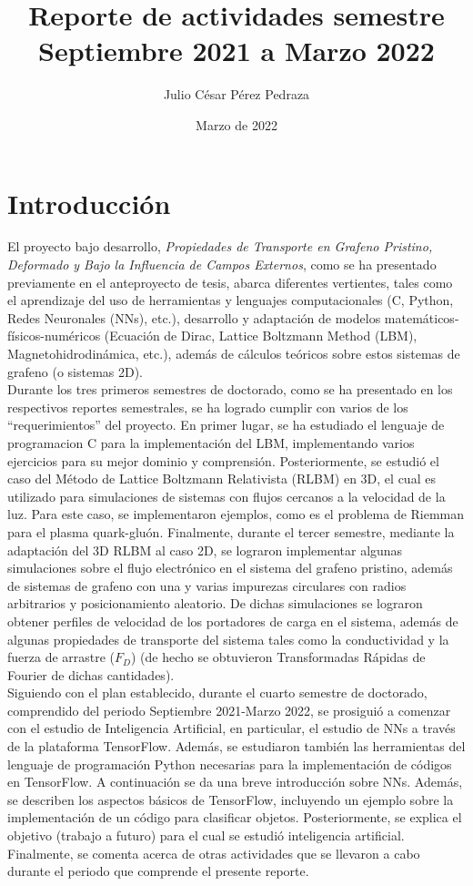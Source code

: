 \documentclass{article}
\title{Reporte de actividades semestre Septiembre 2021 a Marzo 2022}
\author{Julio César Pérez Pedraza}
\date{Marzo de 2022}
\begin{document}
\maketitle

\section{Introducción}

El proyecto bajo desarrollo, \textit{Propiedades de Transporte en Grafeno Pristino, Deformado y Bajo la Influencia de Campos Externos}, como se ha presentado previamente en el anteproyecto de tesis, abarca diferentes vertientes, tales como el aprendizaje del uso de herramientas y lenguajes computacionales (C, Python, Redes Neuronales (NNs), etc.), desarrollo y adaptación de modelos matemáticos-físicos-numéricos (Ecuación de Dirac, Lattice Boltzmann Method (LBM), Magnetohidrodinámica, etc.), además de cálculos teóricos sobre estos sistemas de grafeno (o sistemas 2D).\\

Durante los tres primeros semestres de doctorado, como se ha presentado en los respectivos reportes semestrales, se ha logrado cumplir con varios de los ``requerimientos'' del proyecto. En primer lugar, se ha estudiado el lenguaje de programacion C para la implementación del LBM, implementando varios ejercicios para su mejor dominio y comprensión. Posteriormente, se estudió el caso del Método de Lattice Boltzmann Relativista (RLBM) en 3D, el cual es utilizado para simulaciones de sistemas con flujos cercanos a la velocidad de la luz. Para este caso, se implementaron ejemplos, como es el problema de Riemman para el plasma quark-gluón. Finalmente, durante el tercer semestre, mediante la adaptación del 3D RLBM al caso 2D, se lograron implementar algunas simulaciones sobre el flujo electrónico en el sistema del grafeno pristino, además de sistemas de grafeno con una y varias impurezas circulares con radios arbitrarios y posicionamiento aleatorio. De dichas simulaciones se lograron obtener perfiles de velocidad de los portadores de carga en el sistema, además de algunas propiedades de transporte del sistema tales como la conductividad y la fuerza de arrastre ($F_D$) (de hecho se obtuvieron Transformadas Rápidas de Fourier de dichas cantidades).\\

Siguiendo con el plan establecido, durante el cuarto semestre de doctorado, comprendido del periodo Septiembre 2021-Marzo 2022, se prosiguió a comenzar con el estudio de Inteligencia Artificial, en particular, el estudio de NNs a través de la plataforma TensorFlow. Además, se estudiaron también las herramientas del lenguaje de programación Python necesarias para la implementación de códigos en TensorFlow. A continuación se da una breve introducción sobre NNs. Además, se describen los aspectos básicos de TensorFlow, incluyendo un ejemplo sobre la implementación de un código para clasificar objetos. Posteriormente, se explica el objetivo (trabajo a futuro) para el cual se estudió inteligencia artificial. Finalmente, se comenta acerca de otras actividades que se llevaron a cabo durante el periodo que comprende el presente reporte.
\end{document}
